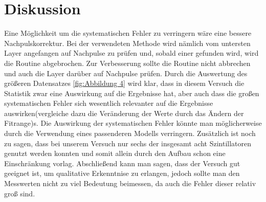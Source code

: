 \section{Diskussion}
Eine Möglichkeit um die systematischen Fehler zu verringern wäre eine bessere Nachpulskorrektur. Bei der verwendeten Methode wird nämlich vom untersten Layer angefangen auf Nachpulse zu prüfen und, sobald einer gefunden wird, wird die Routine abgebrochen. Zur Verbesserung sollte die Routine nicht abbrechen und auch die Layer darüber auf Nachpulse prüfen.
Durch die Auswertung des grö{\ss}eren Datensatzes \ref{fig:Abbildung 4} wird klar, dass in diesem Versuch die Statistik zwar eine Auswirkung auf die Ergebnisse hat, aber auch dass die gro{\ss}en systematischen Fehler sich wesentlich relevanter auf die Ergebnisse auswirken(vergleiche dazu die Veränderung der Werte durch das Ändern der Fitrange)s. Die Auswirkung der systematischen Fehler könnte man möglicherweise durch die Verwendung eines passenderen Modells verringern.
Zusätzlich ist noch zu sagen, dass bei unserem Versuch nur sechs der insgesamt acht Szintillatoren genutzt werden konnten und somit allein durch den Aufbau schon eine Einschränkung vorlag. Abschlie{\ss}end kann man sagen, dass der Versuch gut geeignet ist, um qualitative Erkenntnise zu erlangen, jedoch sollte man den Messwerten nicht zu viel Bedeutung beimessen, da auch die Fehler dieser relativ gro{\ss} sind.
